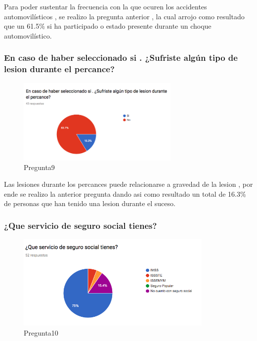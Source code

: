 Para poder sustentar la frecuencia con la que ocuren los accidentes automovilísticos , se realizo la pregunta anterior , la cual arrojo como resultado que un 61.5\% si ha participado o estado presente durante un choque automovilístico. \\

\subsubsection{En caso de haber seleccionado si . ¿Sufriste algún tipo de lesion durante el percance?}

\begin{figure}[htbp!]
	\begin{center}
		\includegraphics[width=0.7\textwidth]{DisenoEstructura/imagenes/Pregunta9}
		\caption{Pregunta9}
		\label{DE/FO/Pregunta9}
	\end{center}
\end{figure}

Las lesiones durante los percances puede relacionarse a gravedad de la lesion , por ende se realizo la anterior pregunta dando asi como resultado un total de 16.3\%  de personas que han tenido una lesion durante el suceso.\\

\subsubsection{¿Que servicio de seguro social tienes?}

\begin{figure}[htbp!]
	\begin{center}
		\includegraphics[width=0.85\textwidth]{DisenoEstructura/imagenes/Pregunta10}
		\caption{Pregunta10}
		\label{DE/FO/Pregunta10}
	\end{center}
\end{figure}

